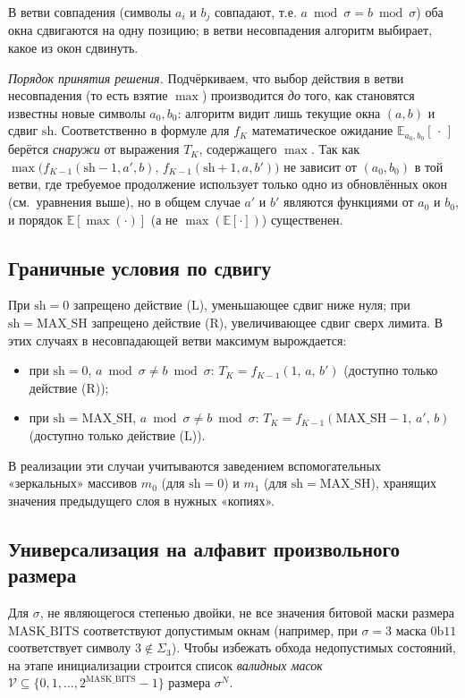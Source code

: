 В ветви совпадения (символы $a_i$ и $b_j$ совпадают, т.е. $a \bmod \sigma = b \bmod \sigma$) оба окна сдвигаются на одну позицию; в ветви несовпадения алгоритм выбирает, какое из окон сдвинуть.

\emph{Порядок принятия решения.} Подчёркиваем, что выбор действия в ветви несовпадения (то есть взятие $\max$) производится \emph{до} того, как становятся известны новые символы $a_0, b_0$: алгоритм видит лишь текущие окна $(a, b)$ и сдвиг $\mathrm{sh}$. Соответственно в формуле для $f_K$ математическое ожидание $\mathbb{E}_{a_0, b_0}[\,\cdot\,]$ берётся \emph{снаружи} от выражения $T_K$, содержащего $\max$. Так как $\max\bigl(f_{K-1}(\mathrm{sh}-1, a', b),\, f_{K-1}(\mathrm{sh}+1, a, b')\bigr)$ не зависит от $(a_0, b_0)$ в той ветви, где требуемое продолжение использует только одно из обновлённых окон (см.~уравнения выше), но в общем случае $a'$ и $b'$ являются функциями от $a_0$ и $b_0$, и порядок $\mathbb{E}[\max(\cdot)]$ (а не $\max(\mathbb{E}[\cdot])$) существенен.

\subsection{Граничные условия по сдвигу}

При $\mathrm{sh} = 0$ запрещено действие (L), уменьшающее сдвиг ниже нуля; при $\mathrm{sh} = \mathrm{MAX\_SH}$ запрещено действие (R), увеличивающее сдвиг сверх лимита. В этих случаях в несовпадающей ветви максимум вырождается:
\begin{itemize}
    \item при $\mathrm{sh} = 0$, $a \bmod \sigma \neq b \bmod \sigma$: $T_K = f_{K-1}(1,\, a,\, b')$ (доступно только действие (R));
    \item при $\mathrm{sh} = \mathrm{MAX\_SH}$, $a \bmod \sigma \neq b \bmod \sigma$: $T_K = f_{K-1}(\mathrm{MAX\_SH}-1,\, a',\, b)$ (доступно только действие (L)).
\end{itemize}

В реализации эти случаи учитываются заведением вспомогательных «зеркальных» массивов $m_0$ (для $\mathrm{sh} = 0$) и $m_1$ (для $\mathrm{sh} = \mathrm{MAX\_SH}$), хранящих значения предыдущего слоя в нужных «копиях».

\subsection{Универсализация на алфавит произвольного размера}

Для $\sigma$, не являющегося степенью двойки, не все значения битовой маски размера $\mathrm{MASK\_BITS}$ соответствуют допустимым окнам (например, при $\sigma = 3$ маска $\mathrm{0b11}$ соответствует символу $3 \notin \Sigma_3$). Чтобы избежать обхода недопустимых состояний, на этапе инициализации строится список \emph{валидных масок} $\mathcal{V} \subseteq \{0, 1, \ldots, 2^{\mathrm{MASK\_BITS}}-1\}$ размера $\sigma^N$.

